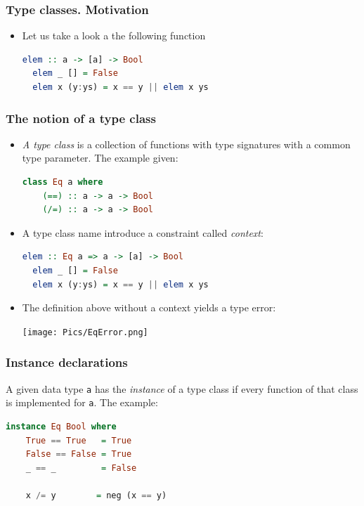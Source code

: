 \documentclass[10pt,pdf,utf8,russian,aspectratio=169]{beamer}
\begin{document}
\begin{frame}[fragile]
  \frametitle{Type classes. Motivation}

\begin{itemize}
  \item Let us take a look a the following function

  \begin{lstlisting}[language=Haskell]
  elem :: a -> [a] -> Bool
  elem _ [] = False
  elem x (y:ys) = x == y || elem x ys
  \end{lstlisting}

 
\end{itemize}
\end{frame}

\begin{frame}[fragile]
  \frametitle{The notion of a type class}

\begin{itemize}
  \item \emph{A type class} is a collection of functions with type signatures with a common type parameter. The example given:

  \begin{lstlisting}[language=Haskell]
  class Eq a where
    (==) :: a -> a -> Bool
    (/=) :: a -> a -> Bool
  \end{lstlisting}

  \item A type class name introduce a constraint called \emph{context}:

  \begin{lstlisting}[language=Haskell]
  elem :: Eq a => a -> [a] -> Bool
  elem _ [] = False
  elem x (y:ys) = x == y || elem x ys
  \end{lstlisting}

  \item The definition above without a context yields a type error:
  \begin{center}
  \texttt{[image: Pics/EqError.png]}
  \end{center}
\end{itemize}
\end{frame}

\begin{frame}[fragile]
  \frametitle{Instance declarations}

  A given data type \verb"a" has the \emph{instance} of a type class if every function of that class is implemented for \verb"a". The example:

  \begin{lstlisting}[language=Haskell]
  instance Eq Bool where
    True == True   = True
    False == False = True
    _ == _         = False

    x /= y        = neg (x == y)
  \end{lstlisting}
\end{frame}
\end{document}
